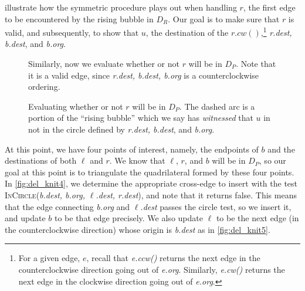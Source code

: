 \documentclass[12pt,twoside]{reedthesis}
\begin{document}
       illustrate how the symmetric procedure plays out when handling $r$, the first edge to be encountered by the rising bubble in $D_{R}$. Our goal is to make sure that $r$ is valid, and subsequently, to show that $u$, the destination of the $r.cw()$,\footnote{For a given edge, $e$, recall that \textit{e.ccw()} returns the next edge in the counterclockwise direction going out of \textit{e.org}. Similarly, \textit{e.cw()} returns the next edge in the clockwise direction going out of \textit{e.org}.} \textit{r.dest, b.dest}, and \textit{b.org}.

      \begin{figure}[H]
        \ContinuedFloat
        \centering
          \begin{subtable}{\textwidth}
          \centering
          
          \caption{Similarly, now we evaluate whether or not $r$ will be in $D_{P}$. Note that it is a valid edge, since \textit{r.dest, b.dest, b.org} is a counterclockwise ordering.}
          \label{fig:del_knit2}
        \end{subtable}
      \end{figure}

      \begin{figure}[H]
        \ContinuedFloat
        \centering
        \begin{subtable}{\textwidth}
          \centering
          
          \caption{Evaluating whether or not $r$ will be in $D_{P}$. The dashed arc is a portion of the ``rising bubble'' which we say has \emph{witnessed} that $u$ in not in the circle defined by \textit{r.dest, b.dest}, and \textit{b.org}.}
          \label{fig:del_knit3}
        \end{subtable}
      \end{figure}

      At this point, we have four points of interest, namely, the endpoints of $b$ and the destinations of both $\ell$ and $r$. We know that $\ell$, $r$, and $b$ will be in $D_{P}$, so our goal at this point is to triangulate the quadrilateral formed by these four points. In \cref{fig:del_knit4}, we determine the appropriate cross-edge to insert with the test \textsc{InCircle}(\textit{b.dest, b.org, $\ell$.dest, r.dest}), and note that it returns false. This means that the edge connecting \textit{b.org} and \textit{$\ell$.dest} passes the circle test, so we insert it, and update $b$ to be that edge precisely. We also update $\ell$ to be the next edge (in the counterclockwise direction) whose origin is \textit{b.dest} as in \cref{fig:del_knit5}.\par
\end{document}
